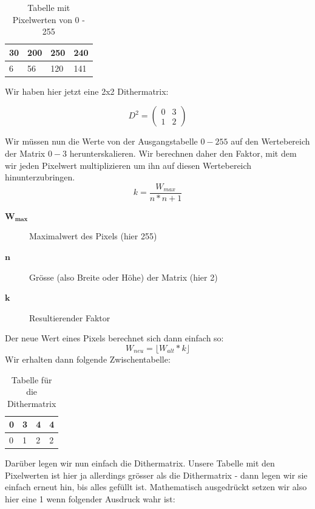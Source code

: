 \begin{table}[!ht]
	\centering
	\caption{Tabelle mit Pixelwerten von 0 - 255}
	\label{tbl:ausgangstabelle}
	\begin{tabular}{|l|l|l|l|}
		\hline
		30 & 200 & 250 & 240 \\ \hline
		6  & 56  & 120 & 141 \\ 
		\hline
	\end{tabular}
\end{table}

Wir haben hier jetzt eine 2x2 Dithermatrix:

\begin{displaymath}
D^2 = \begin{pmatrix}
0 & 3 \\
1 & 2
\end{pmatrix}
\end{displaymath}

Wir müssen nun die Werte von der Ausgangstabelle \(0-255\) auf den Wertebereich der Matrix \(0-3\) herunterskalieren. Wir berechnen daher den Faktor, mit dem wir jeden Pixelwert multiplizieren um ihn auf diesen Wertebereich hinunterzubringen.
\begin{displaymath}
k = \frac{W_{max}}{n*n+1}
\end{displaymath}

\begin{description}
	\item[\(\mathbf{W_{max}}\)] Maximalwert des Pixels (hier 255)
	\item[\(\mathbf{n}\)] Grösse (also Breite oder Höhe) der Matrix (hier 2)
	\item[\(\mathbf{k}\)] Resultierender Faktor
\end{description}
Der neue Wert eines Pixels berechnet sich dann einfach so:
\begin{displaymath}
W_{neu} = \lfloor W_{alt} * k \rfloor
\end{displaymath}
Wir erhalten dann folgende Zwischentabelle:

\begin{table}[!ht]
	\centering
	\caption{Tabelle für die Dithermatrix}
	\label{tbl:zwischentabelle}
	\begin{tabular}{|l|l|l|l|}
		\hline
		0 & 3 & 4 & 4 \\ \hline
		0  & 1  & 2 & 2 \\ 
		\hline
	\end{tabular}
\end{table}
Darüber legen wir nun einfach die Dithermatrix. Unsere Tabelle mit den Pixelwerten ist hier ja allerdings grösser als die Dithermatrix - dann legen wir sie einfach erneut hin, bis alles gefüllt ist. Mathematisch ausgedrückt setzen wir also hier eine 1 wenn folgender Ausdruck wahr ist:

